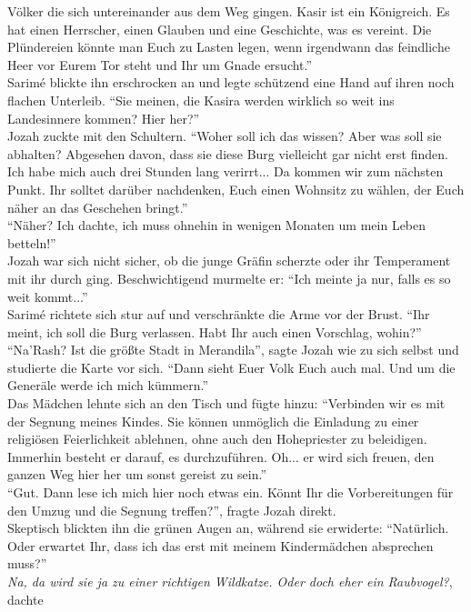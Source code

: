 Völker die sich untereinander aus dem Weg gingen. Kasir ist ein Königreich. Es hat einen Herrscher, 
einen Glauben und eine Geschichte, was es vereint. Die Plündereien könnte man Euch zu Lasten legen, 
wenn irgendwann das feindliche Heer vor Eurem Tor steht und Ihr um Gnade ersucht.''\\
Sarimé blickte ihn erschrocken an und legte schützend eine Hand auf ihren noch flachen Unterleib. 
``Sie meinen, die Kasira werden wirklich so weit ins Landesinnere kommen? Hier her?''\\
Jozah zuckte mit den Schultern. ``Woher soll ich das wissen? Aber was soll sie abhalten? 
Abgesehen davon, dass sie diese Burg vielleicht gar nicht erst finden. Ich habe mich 
auch drei Stunden lang verirrt... Da kommen wir zum nächsten Punkt. Ihr solltet darüber nachdenken, 
Euch einen Wohnsitz zu wählen, der Euch näher an das Geschehen bringt.''\\
``Näher? Ich dachte, ich muss ohnehin in wenigen Monaten um mein Leben betteln!''\\
Jozah war sich nicht sicher, ob die junge Gräfin scherzte oder ihr Temperament mit ihr durch ging. 
Beschwichtigend murmelte er: ``Ich meinte ja nur, falls es so weit kommt...''\\
Sarimé richtete sich stur auf und verschränkte die Arme vor der Brust. ``Ihr meint, ich soll die 
Burg verlassen. Habt Ihr auch einen Vorschlag, wohin?''\\
``Na'Rash? Ist die größte Stadt in Merandila'', sagte Jozah wie zu sich selbst und studierte die 
Karte vor sich. ``Dann sieht Euer Volk Euch auch mal. Und um die Generäle werde ich mich 
kümmern.''\\
Das Mädchen lehnte sich an den Tisch und fügte hinzu: ``Verbinden wir es mit der Segnung meines 
Kindes. Sie können unmöglich die Einladung zu einer religiösen Feierlichkeit ablehnen, ohne auch 
den Hohepriester zu beleidigen. Immerhin besteht er darauf, es durchzuführen. Oh... er wird sich 
freuen, den ganzen Weg hier her um sonst gereist zu sein.''\\
``Gut. Dann lese ich mich hier noch etwas ein. Könnt Ihr die Vorbereitungen für den Umzug und die 
Segnung treffen?'', fragte Jozah direkt.\\
Skeptisch blickten ihn die grünen Augen an, während sie erwiderte: ``Natürlich. Oder erwartet 
Ihr, dass ich das erst mit meinem Kindermädchen absprechen muss?''\\
\textit{Na, da wird sie ja zu einer richtigen Wildkatze. Oder doch eher ein Raubvogel?}, dachte 

